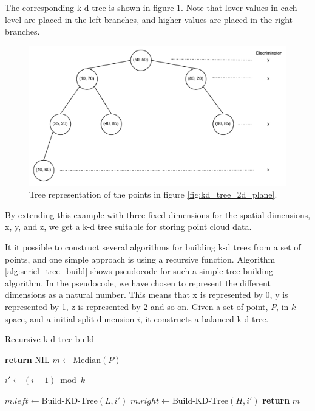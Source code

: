 The corresponding k-d tree is shown in figure \ref{fig:kd_tree_2d}. Note that lover values in each level are placed in the left branches, and higher values are placed in the right branches.

\begin{figure}[ht!]
\centering
\includegraphics[width=120mm]{../gfx/kd_tree_illustration_tree.png}
\caption{Tree representation of the points in figure \ref{fig:kd_tree_2d_plane}.}
\label{fig:kd_tree_2d}
\end{figure}

By extending this example with three fixed dimensions for the spatial dimensions, x, y, and z, we get a k-d tree suitable for storing point cloud data.

It it possible to construct several algorithms for building k-d trees from a set of points, and one simple approach is using a recursive function. Algorithm \ref{alg:seriel_tree_build} shows pseudocode for such a simple tree building algorithm. In the pseudocode, we have chosen to represent the different dimensions as a natural number. This means that x is represented by 0, y is represented by 1, z is represented by 2 and so on. Given a set of point, $P$, in $k$ space, and a initial split dimension $i$, it constructs a balanced k-d tree.

\begin{algorithm}
\caption{Recursive k-d tree build}
\label{alg:seriel_tree_build}
\begin{algorithmic}
         
            \State \textbf{return} NIL 
        \Else
            \State $m \gets \text{Median}(P)$

            \State {}
            \State {}
            
            \State $i' \gets (i + 1) \bmod k$ 
            
            \State $m.left \gets \text{Build-KD-Tree}(L, i')$
            \State $m.right \gets \text{Build-KD-Tree}(H, i')$
        \EndIf
        \State \textbf{return} $m$
    \EndFunction
\end{algorithmic}
\end{algorithm}

